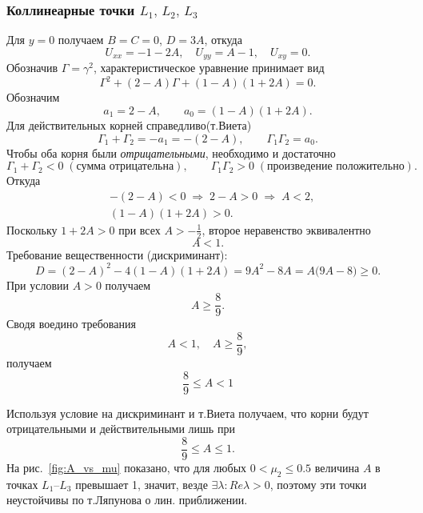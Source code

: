 \documentclass[12pt]{article}
\newcommand{\mutwo}{\mu_2}
\begin{document}
\subsubsection{Коллинеарные точки $L_1,\,L_2,\,L_3$}
Для $y=0$ получаем $B=C=0$, $D=3A$, откуда
\begin{equation}\label{eq:Ucol}\tag{*}
  U_{xx}=-1-2A,\quad U_{yy}=A-1,\quad U_{xy}=0.
\end{equation}
Обозначив $\Gamma=\gamma^{2}$, характеристическое уравнение принимает вид
\begin{equation}\tag{1113}
  \Gamma^{2}+(2-A)\Gamma+(1-A)(1+2A)=0.
\end{equation}
Обозначим
\[
a_1=2-A,\qquad a_0=(1-A)(1+2A).
\]
Для действительных корней справедливо(т.Виета)
\[
\Gamma_1+\Gamma_2=-a_1=-(2-A),\qquad \Gamma_1\Gamma_2=a_0.
\]
Чтобы оба корня были \emph{отрицательными}, необходимо и достаточно
\[
\Gamma_1+\Gamma_2<0\;(\text{сумма отрицательна}),\qquad \Gamma_1\Gamma_2>0\;(\text{произведение положительно}).
\]
Откуда
\begin{align}
&-(2-A)<0\;\Longrightarrow\;2-A>0\;\Longrightarrow\;A<2,\\[4pt]
&(1-A)(1+2A)>0.
\end{align}
Поскольку \(1+2A>0\) при всех \(A>-\tfrac12\), второе неравенство эквивалентно
\[ A<1. \]
Требование вещественности (дискриминант):
\begin{equation}
D=(2-A)^2-4(1-A)(1+2A)=9A^{2}-8A=A\bigl(9A-8\bigr)\ge0.
\end{equation}
При условии \(A>0\) получаем 
\[ A\ge\frac89. \]
Сводя воедино требования
\[ A<1,\quad A\ge\frac89, \]
получаем 
\begin{equation}
\frac89\le A<1
\end{equation}


Используя условие на дискриминант и т.Виета получаем, что корни будут отрицательными и действительными лишь при
\begin{equation}\tag{1115}
  \frac{8}{9}\le A\le1.
\end{equation}
На рис.~\ref{fig:A_vs_mu} показано, что для любых $0<\mutwo\le0.5$ величина $A$ в точках $L_1$–$L_3$ превышает 1, значит, везде $\exists\lambda:Re\lambda > 0$, поэтому эти точки неустойчивы по т.Ляпунова о лин. приближении.
\end{document}
